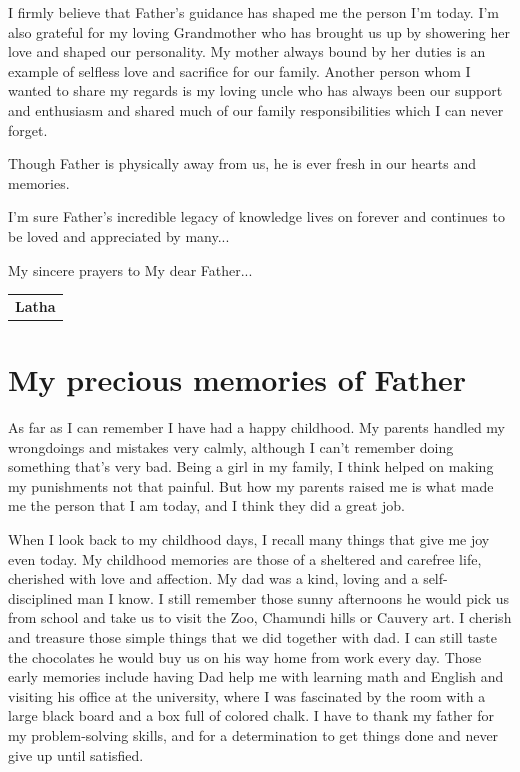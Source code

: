 I firmly believe that Father’s guidance has shaped me the person I’m today. I’m also grateful for my loving Grandmother who has brought us up by showering her love and shaped our personality. My mother always bound by her duties is an example of selfless love and sacrifice for our family. Another person whom I wanted to share my regards is my loving uncle who has always been our support and enthusiasm and shared much of our family responsibilities which I can never forget. 

Though Father is physically away from us, he is ever fresh in our hearts and memories.

I’m sure Father’s incredible legacy of knowledge lives on forever and continues to be loved and appreciated by many...

My sincere prayers to My dear Father...
\bigskip

\begin{flushright}
\begin{tabular}{c}
\textbf{Latha}
\end{tabular}
\end{flushright}
\bigskip

\section*{My precious memories of Father}

As far as I can remember I have had a happy childhood. My parents handled my wrongdoings and mistakes very calmly, although I can’t remember doing something that’s very bad. Being a girl in my family, I think helped on making my punishments not that painful. But how my parents raised me is what made me the person that I am today, and I think they did a great job.

When I look back to my childhood days, I recall many things that give me joy even today. My childhood memories are those of a sheltered and carefree life, cherished with love and affection. My dad was a kind, loving and a self-disciplined man I know. I still remember those sunny afternoons he would pick us from school and take us to visit the Zoo, Chamundi hills or Cauvery art. I cherish and treasure those simple things that we did together with dad. I can still taste the chocolates he would buy us on his way home from work every day. Those early memories include having Dad help me with learning math and English and visiting his office at the university, where I was fascinated by the room with a large black board and a box full of colored chalk. I have to thank my father for my problem-solving skills, and for a determination to get things done and never give up until satisfied.

